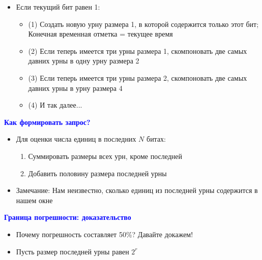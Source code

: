 \documentclass[landscape]{slides}
\begin{document}
\begin{normalsize}
\begin{slide}
\begin{itemize}
\item Если текущий бит равен 1:

  \begin{itemize}
  \item (1) Создать новую урну размера 1, в которой содержится только этот бит;\\
    Конечная временная отметка = текущее время

  \item (2) Если теперь имеется три урны размера 1, скомпоновать две самых давних урны в одну урну размера 2

  \item (3) Если теперь имеется три урны размера 2, скомпоновать две самых давних урны в урну размера 4

  \item (4) И так далее...
  \end{itemize}
\end{itemize}
\end{slide}


\begin{slide}
\textbf{\textcolor{blue}{Как формировать запрос?}}


\begin{itemize}
\item Для оценки числа единиц в последних $N$ битах:

  \begin{enumerate}
  \item Суммировать размеры всех урн, кроме последней

  \item Добавить половину размера последней урны
  \end{enumerate}

\item Замечание: Нам неизвестно, сколько единиц из последней урны содержится в нашем окне
\end{itemize}
\end{slide}


\begin{slide}
\textbf{\textcolor{blue}{Граница погрешности: доказательство}}

\begin{itemize}
\item Почему погрешность составляет 50\%? Давайте докажем!

\item Пусть размер последней урны равен $2^r$


\end{itemize}
\end{slide}
\end{normalsize}
\end{document}
